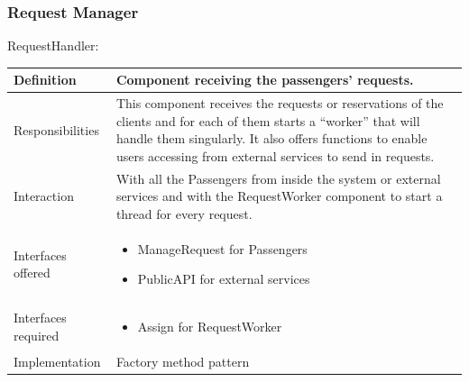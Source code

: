 \documentclass[a4paper,11pt]{report} %
\begin{document}
	\subsubsection{Request Manager}
	\begin{minipage}{\linewidth}
	\end{minipage} \linebreak
	\centerline{RequestHandler:}
	\begin{center}
		\begin{tabular}{| l | p{9cm} |}\hline
			Definition & Component receiving the passengers' requests.\\\hline
			Responsibilities & This component receives the requests or reservations of the clients and for each of them starts a ``worker'' that will handle them singularly. It also offers functions to enable users accessing from external services to send in requests.\\\hline
			Interaction & With all the Passengers from inside the system or external services and with the RequestWorker component to start a thread for every request.\\\hline
			Interfaces offered & \begin{itemize}
				\item ManageRequest for Passengers
				\item PublicAPI for external services
			\end{itemize}\\\hline
			Interfaces required & \begin{itemize}
				\item Assign for RequestWorker
			\end{itemize}\\\hline
			Implementation & Factory method pattern\\\hline
		\end{tabular}
	\end{center}
	
\end{document}
